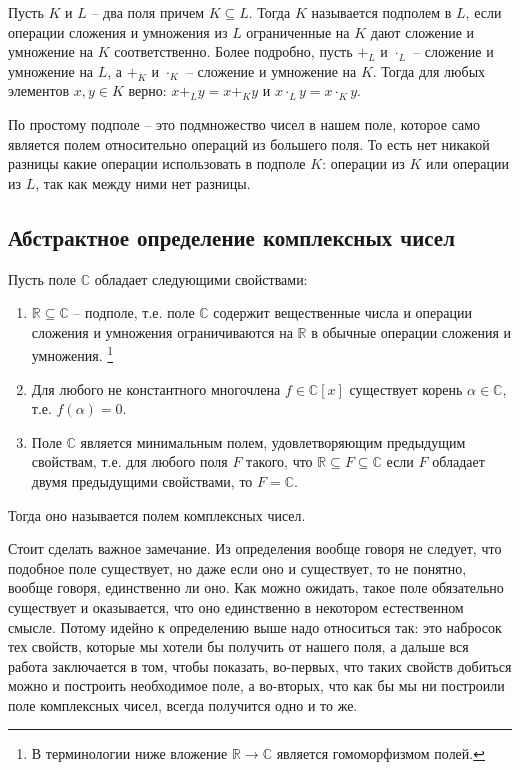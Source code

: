 \begin{definition}
[Подполе]
Пусть $K$ и $L$ -- два поля причем $K \subseteq L$.
Тогда $K$ называется подполем в $L$, если операции сложения и умножения из $L$ ограниченные на $K$ дают сложение и умножение на $K$ соответственно.
Более подробно, пусть $+_L$ и $\cdot_L$ -- сложение и умножение на $L$, а $+_K$ и $\cdot_K$ -- сложение и умножение на $K$.
Тогда для любых элементов $x,y\in K$ верно: $x +_L y = x+_K y$ и $x\cdot_L y = x \cdot_K y$.
\end{definition}

По простому подполе -- это подмножество чисел в нашем поле, которое само является полем относительно операций из большего поля.
То есть нет никакой разницы какие операции использовать в подполе $K$: операции из $K$ или операции из $L$, так как между ними нет разницы.

\subsection{Абстрактное определение комплексных чисел}

\begin{definition}
\label{def::ComplexAbstr}
Пусть поле $\mathbb C$ обладает следующими свойствами:
\begin{enumerate}
\item $\mathbb R\subseteq\mathbb C$ -- подполе, т.е. поле $\mathbb C$ содержит вещественные числа и операции сложения и умножения ограничиваются на $\mathbb R$ в обычные операции сложения и умножения.%
\footnote{В терминологии ниже вложение $\mathbb R\to \mathbb C$ является гомоморфизмом полей.}

\item Для любого не константного многочлена $f\in\mathbb C[x]$ существует корень $\alpha\in \mathbb C$, т.е. $f(\alpha) = 0$.

\item Поле $\mathbb C$ является минимальным полем, удовлетворяющим предыдущим свойствам, т.е. для любого поля $F$ такого, что $\mathbb R\subseteq F\subseteq \mathbb C$ если $F$ обладает двумя предыдущими свойствами, то $F = \mathbb C$.
\end{enumerate}
Тогда оно называется полем комплексных чисел.
\end{definition}

Стоит сделать важное замечание.
Из определения вообще говоря не следует, что подобное поле существует, но даже если оно и существует, то не понятно, вообще говоря, единственно ли оно.
Как можно ожидать, такое поле обязательно существует и оказывается, что оно единственно в некотором естественном смысле.
Потому идейно к определению выше надо относиться так: это набросок тех свойств, которые мы хотели бы получить от нашего поля, а дальше вся работа заключается в том, чтобы показать, во-первых, что таких свойств добиться можно и построить необходимое поле, а во-вторых, что как бы мы ни построили поле комплексных чисел, всегда получится одно и то же.

